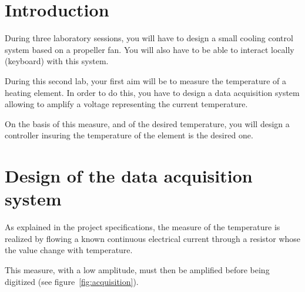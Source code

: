 \documentclass[11pt,a4paper]{article}
\theoremstyle{definition}%
\begin{document}
\section{Introduction}
During three laboratory sessions, you will have to design a small cooling control system based on a propeller fan.
You will also have to be able to interact locally (keyboard) with this system.

During this second lab, your first aim will be to measure the temperature of a heating element.
In order to do this, you have to design a data acquisition system allowing to amplify a voltage representing the current temperature.

On the basis of this measure, and of the desired temperature, you will design a controller insuring the temperature of the element is the desired one.









\section{Design of the data acquisition system}
As explained in the project specifications, the measure of the temperature is realized by flowing a known continuous electrical current through a resistor whose the value change with temperature.

This measure, with a low amplitude, must then be amplified before being digitized (see figure~\ref{fig:acquisition}).
\end{document}
